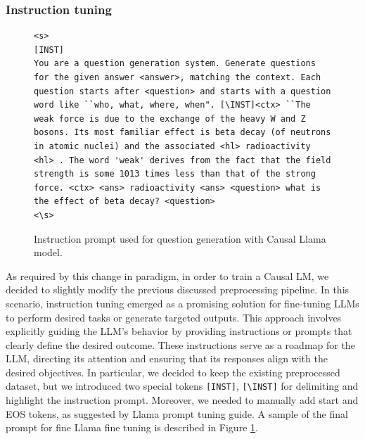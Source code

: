 \documentclass{article}
\begin{document}
\subsubsection{Instruction tuning}
\begin{figure}[ht]
    \centering
\begin{lstlisting}[label=lst:prompt, language=prompt]
<s>
[INST] 
You are a question generation system. Generate questions for the given answer <answer>, matching the context. Each question starts after <question> and starts with a question word like ``who, what, where, when". [\INST]<ctx> ``The weak force is due to the exchange of the heavy W and Z bosons. Its most familiar effect is beta decay (of neutrons in atomic nuclei) and the associated <hl> radioactivity <hl> . The word 'weak' derives from the fact that the field strength is some 1013 times less than that of the strong force. <ctx> <ans> radioactivity <ans> <question> what is the effect of beta decay? <question> 
<\s>
\end{lstlisting}
    \caption{Instruction prompt used for question generation with Causal Llama model. }
    \label{fig:prompt}
\end{figure}

\noindent
As required by this change in paradigm, in order to train a Causal LM, we decided to slightly modify the previous discussed preprocessing pipeline. In this scenario, instruction tuning emerged as a promising solution for fine-tuning LLMs to perform desired tasks or generate targeted outputs. This approach involves explicitly guiding the LLM's behavior by providing instructions or prompts that clearly define the desired outcome. These instructions serve as a roadmap for the LLM, directing its attention and ensuring that its responses align with the desired objectives.
In particular, we decided to keep the existing preprocessed dataset, but we introduced two special tokens \texttt{[INST]}, \texttt{[\textbackslash INST]} for delimiting and highlight the instruction prompt.
Moreover, we needed to manually add start and EOS tokens, as suggested by Llama prompt tuning guide. A sample of the final prompt for fine Llama fine tuning is described in Figure \ref{fig:prompt}.
\end{document}
